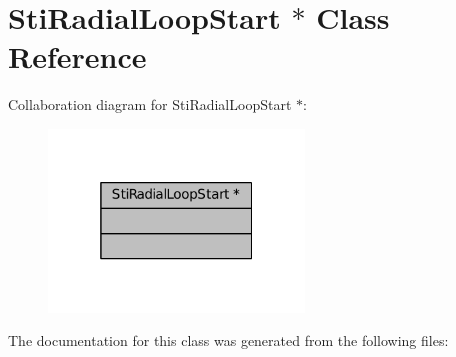 \hypertarget{classStiRadialLoopStart_01_5}{}\section{Sti\+Radial\+Loop\+Start $\ast$ Class Reference}
\label{classStiRadialLoopStart_01_5}


Collaboration diagram for Sti\+Radial\+Loop\+Start $\ast$\+:
\nopagebreak
\begin{figure}[H]
\begin{center}
\leavevmode
\includegraphics[width=193pt]{classStiRadialLoopStart_01_5__coll__graph}
\end{center}
\end{figure}


The documentation for this class was generated from the following files\+: